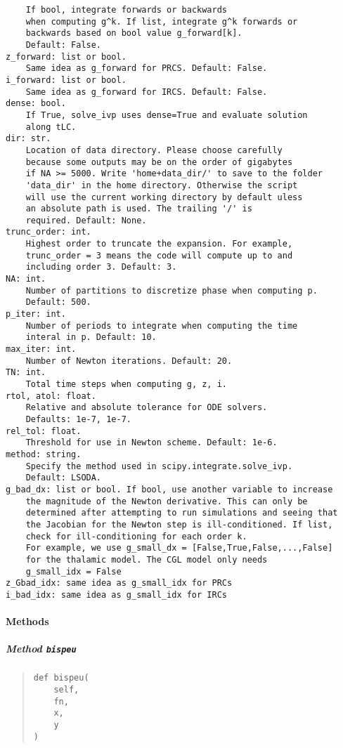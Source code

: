\documentclass[english,a4paper,oneside]{article}
\let\oldparagraph\paragraph
\renewcommand{\paragraph}[1]{\oldparagraph{#1}\mbox{}}
\let\oldsubparagraph\subparagraph
\renewcommand{\subparagraph}[1]{\oldsubparagraph{#1}\mbox{}}
\begin{document}
\begin{verbatim}
    If bool, integrate forwards or backwards
    when computing g^k. If list, integrate g^k forwards or
    backwards based on bool value g_forward[k].
    Default: False.
z_forward: list or bool.
    Same idea as g_forward for PRCS. Default: False.
i_forward: list or bool.
    Same idea as g_forward for IRCS. Default: False.
dense: bool.
    If True, solve_ivp uses dense=True and evaluate solution
    along tLC.
dir: str.
    Location of data directory. Please choose carefully
    because some outputs may be on the order of gigabytes
    if NA >= 5000. Write 'home+data_dir/' to save to the folder
    'data_dir' in the home directory. Otherwise the script
    will use the current working directory by default uless
    an absolute path is used. The trailing '/' is
    required. Default: None.
trunc_order: int.
    Highest order to truncate the expansion. For example, 
    trunc_order = 3 means the code will compute up to and 
    including order 3. Default: 3.
NA: int.
    Number of partitions to discretize phase when computing p.
    Default: 500.
p_iter: int.
    Number of periods to integrate when computing the time 
    interal in p. Default: 10.
max_iter: int.
    Number of Newton iterations. Default: 20.
TN: int.
    Total time steps when computing g, z, i.
rtol, atol: float.
    Relative and absolute tolerance for ODE solvers.
    Defaults: 1e-7, 1e-7.
rel_tol: float.
    Threshold for use in Newton scheme. Default: 1e-6.
method: string.
    Specify the method used in scipy.integrate.solve_ivp.
    Default: LSODA.
g_bad_dx: list or bool. If bool, use another variable to increase
    the magnitude of the Newton derivative. This can only be
    determined after attempting to run simulations and seeing that
    the Jacobian for the Newton step is ill-conditioned. If list,
    check for ill-conditioning for each order k.
    For example, we use g_small_dx = [False,True,False,...,False]
    for the thalamic model. The CGL model only needs
    g_small_idx = False
z_Gbad_idx: same idea as g_small_idx for PRCs
i_bad_idx: same idea as g_small_idx for IRCs
\end{verbatim}

\paragraph{Methods}\label{methods}

\subparagraph{\texorpdfstring{Method
\texttt{bispeu}}{Method bispeu}}\label{StrongCoupling.StrongCoupling.bispeu}

\begin{quote}
\begin{verbatim}
def bispeu(
    self,
    fn,
    x,
    y
)
\end{verbatim}
\end{quote}
\end{document}
